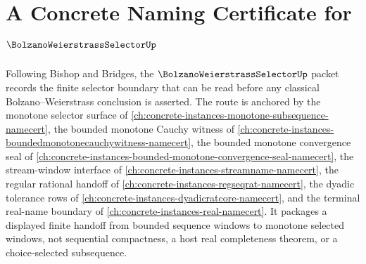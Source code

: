 \chapter{A Concrete Naming Certificate for $\BolzanoWeierstrassSelectorUp$}
\label{ch:concrete-instances-bolzanoweierstrassselector-namecert}

Following Bishop and Bridges, the $\BolzanoWeierstrassSelectorUp$ packet records the finite selector boundary that can be read before any classical Bolzano--Weierstrass conclusion is asserted. The route is anchored by the monotone selector surface of \autoref{ch:concrete-instances-monotone-subsequence-namecert}, the bounded monotone Cauchy witness of \autoref{ch:concrete-instances-boundedmonotonecauchywitness-namecert}, the bounded monotone convergence seal of \autoref{ch:concrete-instances-bounded-monotone-convergence-seal-namecert}, the stream-window interface of \autoref{ch:concrete-instances-streamname-namecert}, the regular rational handoff of \autoref{ch:concrete-instances-regseqrat-namecert}, the dyadic tolerance rows of \autoref{ch:concrete-instances-dyadicratcore-namecert}, and the terminal real-name boundary of \autoref{ch:concrete-instances-real-namecert}. It packages a displayed finite handoff from bounded sequence windows to monotone selected windows, not sequential compactness, a host real completeness theorem, or a choice-selected subsequence.

